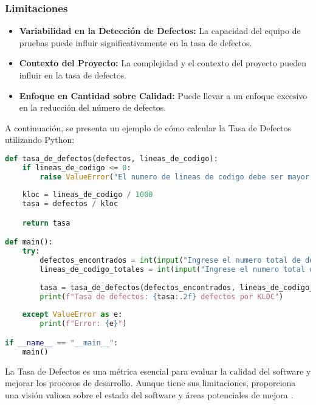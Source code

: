 \documentclass[a4,10pt]{article}
\begin{document}
\subsubsection{Limitaciones}
\begin{itemize}
    \item \textbf{Variabilidad en la Detección de Defectos:} La capacidad del equipo de pruebas puede influir significativamente en la tasa de defectos.
    \item \textbf{Contexto del Proyecto:} La complejidad y el contexto del proyecto pueden influir en la tasa de defectos.
    \item \textbf{Enfoque en Cantidad sobre Calidad:} Puede llevar a un enfoque excesivo en la reducción del número de defectos.
\end{itemize}

\hspace{0.6cm}A continuación, se presenta un ejemplo de cómo calcular la Tasa de Defectos utilizando Python:

\begin{lstlisting}[language=Python, caption=Ejemplo de código en Python para calcular la Tasa de Defectos]
def tasa_de_defectos(defectos, lineas_de_codigo):
    if lineas_de_codigo <= 0:
        raise ValueError("El numero de lineas de codigo debe ser mayor que cero.")
    
    kloc = lineas_de_codigo / 1000
    tasa = defectos / kloc

    return tasa

def main():
    try:
        defectos_encontrados = int(input("Ingrese el numero total de defectos encontrados: "))
        lineas_de_codigo_totales = int(input("Ingrese el numero total de lineas de codigo: "))
        
        tasa = tasa_de_defectos(defectos_encontrados, lineas_de_codigo_totales)
        print(f"Tasa de defectos: {tasa:.2f} defectos por KLOC")
    
    except ValueError as e:
        print(f"Error: {e}")

if __name__ == "__main__":
    main()
\end{lstlisting}

\hspace{0.6cm}La Tasa de Defectos es una métrica esencial para evaluar la calidad del software y mejorar los procesos de desarrollo. Aunque tiene sus limitaciones, proporciona una visión valiosa sobre el estado del software y áreas potenciales de mejora \cite{Farid2021, Akimova2021, Haldar2024}.

\printbibliography
\end{document}
